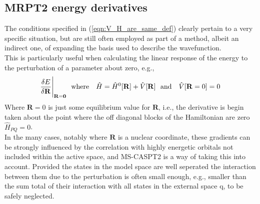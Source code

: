\documentclass[12pt]{article}
\begin{document}
\subsection {MRPT2 energy derivatives}
\noindent The conditions specified in (\ref{eqn:V_H_are_same_def}) clearly pertain to 
a very specific situation, but are still often employed as part of a method, albeit an 
indirect one, of expanding the basis used to describe the wavefunction.\\

\noindent This is particularly useful when calculating the linear response of the energy to the
perturbation of a parameter about zero, e.g., 
\begin{equation}
\frac{ \delta E }{ \delta \mathbf{R} } \Bigg{|}_{\mathbf{\mathbf{R}=0}}
\text{\ \ where \ \ }
\hat{H} = \hat{H}^{0}[\mathbf{R}] + \hat{V}[\mathbf{R}] 
\text{\ \ and \ \ }
\hat{V}[\mathbf{R} = 0 ]  = 0 
\end{equation}
Where $\mathbf{R} = 0$ is just some equilibrium value for $\mathbf{R}$, i.e., the derivative is begin taken
about the point where the off diagonal blocks of the Hamiltonian are zero $\hat{H}_{PQ} = 0$. \\

\noindent  In the many cases, notably where $\mathbf{R}$ is a nuclear coordinate,
these gradients can be strongly influenced by the correlation with highly energetic orbitals not included
within the active space, and MS-CASPT2 is a way of taking this into account.
Provided the states in the model space are well seperated the interaction between them due
to the perturbation is often small enough, e.g., smaller than the sum total of their 
interaction with all states in the external space $\mathrm{q}$, to be safely neglected.\\
\end{document}
